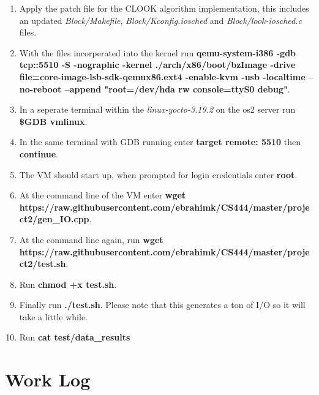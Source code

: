 \documentclass[10pt,onecolumn,draftclsnofoot]{IEEEtran} %
\begin{document}
\begin{singlespace}
	\begin{enumerate}
                \item Apply the patch file for the CLOOK algorithm implementation, this includes an updated \textit{Block/Makefile}, \textit{Block/Kconfig.iosched} and \textit{Block/look-iosched.c} files. 
                \item With the files incorperated into the kernel run \textbf{qemu-system-i386 -gdb tcp::5510 -S -nographic -kernel ./arch/x86/boot/bzImage -drive file=core-image-lsb-sdk-qemux86.ext4 -enable-kvm -usb -localtime --no-reboot --append "root=/dev/hda rw console=ttyS0 debug"}.
                \item In a seperate terminal within the \textit{linux-yocto-3.19.2} on the os2 server run \textbf{\$GDB vmlinux}.
		\item In the same terminal with GDB running enter \textbf{target remote: 5510} then \textbf{continue}.
		\item The VM should start up, when prompted for login credentials enter \textbf{root}.
		\item At the command line of the VM enter \textbf{wget https://raw.githubusercontent.com/ebrahimk/CS444/master/project2/gen\_IO.cpp}.
		\item At the command line again, run \textbf{wget https://raw.githubusercontent.com/ebrahimk/CS444/master/project2/test.sh}.
		\item Run \textbf{chmod +x test.sh}.
		\item Finally run \textbf{./test.sh}. Please note that this generates a ton of I/O so it will take a little while. 
		\item Run \textbf{cat test/data\_results}
        \end{enumerate}
	

\newpage
\section{\bf Work Log}

                

\newpage


\end{singlespace}
\restoregeometry
\end{document}
